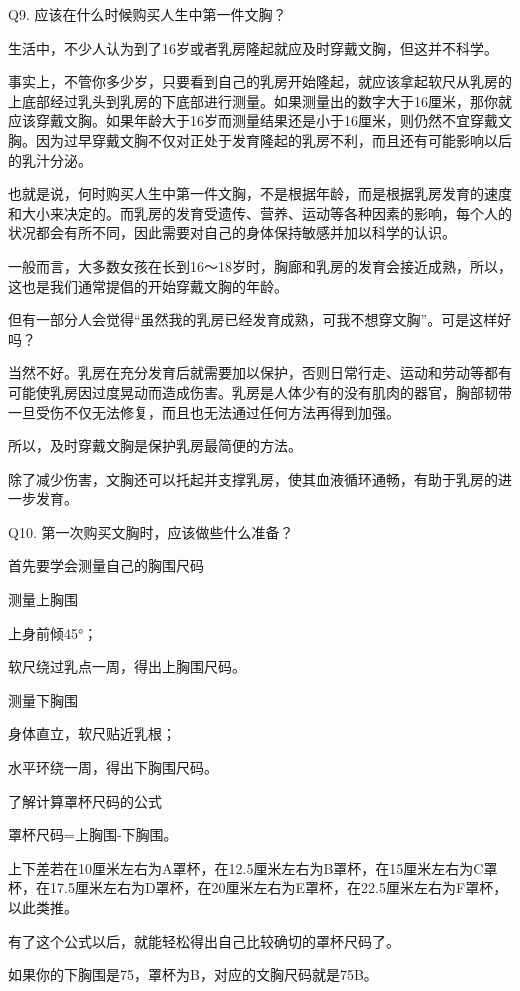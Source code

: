 \documentclass[12pt,UTF8]{ctexbook}
\begin{document}
Q9. 应该在什么时候购买人生中第一件文胸？


生活中，不少人认为到了16岁或者乳房隆起就应及时穿戴文胸，但这并不科学。


事实上，不管你多少岁，只要看到自己的乳房开始隆起，就应该拿起软尺从乳房的上底部经过乳头到乳房的下底部进行测量。如果测量出的数字大于16厘米，那你就应该穿戴文胸。如果年龄大于16岁而测量结果还是小于16厘米，则仍然不宜穿戴文胸。因为过早穿戴文胸不仅对正处于发育隆起的乳房不利，而且还有可能影响以后的乳汁分泌。

也就是说，何时购买人生中第一件文胸，不是根据年龄，而是根据乳房发育的速度和大小来决定的。而乳房的发育受遗传、营养、运动等各种因素的影响，每个人的状况都会有所不同，因此需要对自己的身体保持敏感并加以科学的认识。


一般而言，大多数女孩在长到16～18岁时，胸廊和乳房的发育会接近成熟，所以，这也是我们通常提倡的开始穿戴文胸的年龄。

但有一部分人会觉得“虽然我的乳房已经发育成熟，可我不想穿文胸”。可是这样好吗？

当然不好。乳房在充分发育后就需要加以保护，否则日常行走、运动和劳动等都有可能使乳房因过度晃动而造成伤害。乳房是人体少有的没有肌肉的器官，胸部韧带一旦受伤不仅无法修复，而且也无法通过任何方法再得到加强。

所以，及时穿戴文胸是保护乳房最简便的方法。

除了减少伤害，文胸还可以托起并支撑乳房，使其血液循环通畅，有助于乳房的进一步发育。





Q10. 第一次购买文胸时，应该做些什么准备？


首先要学会测量自己的胸围尺码


测量上胸围

上身前倾45°；

软尺绕过乳点一周，得出上胸围尺码。


测量下胸围

身体直立，软尺贴近乳根；

水平环绕一周，得出下胸围尺码。

了解计算罩杯尺码的公式

罩杯尺码=上胸围-下胸围。

上下差若在10厘米左右为A罩杯，在12.5厘米左右为B罩杯，在15厘米左右为C罩杯，在17.5厘米左右为D罩杯，在20厘米左右为E罩杯，在22.5厘米左右为F罩杯，以此类推。

有了这个公式以后，就能轻松得出自己比较确切的罩杯尺码了。

如果你的下胸围是75，罩杯为B，对应的文胸尺码就是75B。
\end{document}

